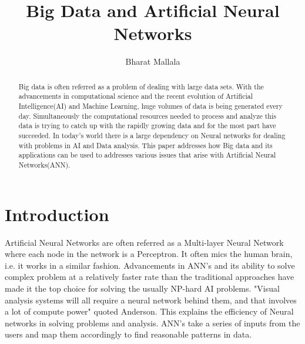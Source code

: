 \documentclass[sigconf]{acmart}
\begin{document}
\title{Big Data and Artificial Neural Networks}



\author{Bharat Mallala}


\renewcommand{\shortauthors}{B. Trovato et al.}


\begin{abstract}
Big data is often referred as a problem of dealing with large data sets. With the advancements in computational science and the recent evolution of Artificial Intelligence(AI) and Machine Learning, huge volumes of data is being generated every day. Simultaneously the computational resources needed to process and analyze this data is trying to catch up with the rapidly growing data and for the most part have succeeded. In today's world there is a large dependency on Neural networks for dealing with problems in AI and Data analysis. This paper addresses how Big data and its applications can be used to addresses various issues that arise with Artificial Neural Networks(ANN). 
\end{abstract}



\maketitle

\section{Introduction}

Artificial Neural Networks are often referred as a Multi-layer Neural Network where each node in the network is a Perceptron. It often mics the human brain, i.e. it works in a similar fashion. Advancements in ANN's and its ability to solve complex problem at a relatively faster rate than the traditional approaches have made it the top choice for solving the usually NP-hard AI problems. "Visual analysis systems will all require a neural network behind them, and that involves a lot of compute power"\cite{1} quoted Anderson. This explains the efficiency of Neural networks in solving problems and analysis. ANN's take a series of inputs from the users and map them accordingly to find reasonable patterns in data.
\end{document}

